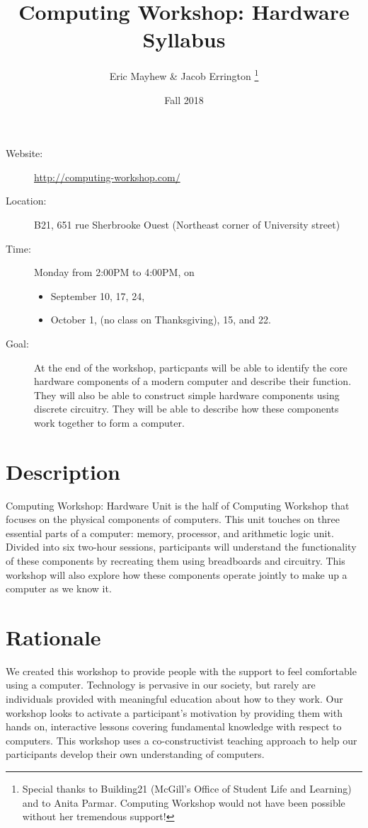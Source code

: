 \documentclass[11pt]{article}
\author{%
  Eric Mayhew \& Jacob Errington%
  \footnote{%
    Special thanks to Building21 (McGill's Office of Student Life and Learning)
    and to Anita Parmar.
    Computing Workshop would not have been possible without her tremendous
    support!
  }
}
\title{Computing Workshop: Hardware Syllabus}
\date{Fall 2018}
\begin{document}
\maketitle

\begin{description}
  \item[Website:]
    \url{http://computing-workshop.com/}

  \item[Location:]
    B21, 651 rue Sherbrooke Ouest
    (Northeast corner of University street)

  \item[Time:]
    Monday from 2:00PM to 4:00PM, on
    \begin{itemize}
    \item September 10, 17, 24,
    \item October 1, (no class on Thanksgiving), 15, and 22.
    \end{itemize}

  \item[Goal:]
    At the end of the workshop, particpants will be able to identify the core
    hardware components of a modern computer and describe their function.
    They will also be able to construct simple hardware components using discrete
    circuitry.
    They will be able to describe how these components work together to form
    a computer.
\end{description}

\section*{Description}

Computing Workshop: Hardware Unit is the half of Computing Workshop that focuses
on the physical components of computers. This unit touches on three essential
parts of a computer: memory, processor, and arithmetic logic unit.
Divided into six two-hour sessions, participants will understand the
functionality of these components by recreating them using breadboards and
circuitry.
This workshop will also explore how these components operate jointly to make up
a computer as we know it.

\section*{Rationale}

We created this workshop to provide people with the support to feel comfortable
using a computer. Technology is pervasive in our society, but rarely are
individuals provided with meaningful education about how to they work. Our workshop
looks to activate a participant's motivation by providing them with hands on,
interactive lessons covering fundamental knowledge with respect to computers.
This workshop uses a co-constructivist teaching approach to help our
participants develop their own understanding of computers.
\end{document}
